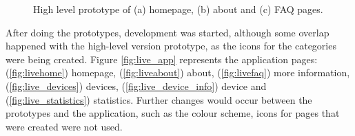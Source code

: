 \begin{figure}[H]
\begin{subfigure}{0.33\textwidth}
        \caption{}
        \label{fig:highfaq}
    \end{subfigure}%
    \caption{High level prototype of (a) homepage, (b) about and (c) FAQ pages.}
    \label{fig:highlevelprototype}
\end{figure}

After doing the prototypes, development was started, although some overlap
happened with the high-level version prototype, as the icons for the categories
were being created. Figure \ref{fig:live_app} represents the application pages:
(\ref{fig:livehome}) homepage, (\ref{fig:liveabout}) about, (\ref{fig:livefaq}) more
information, (\ref{fig:live_devices}) \hyperlink{\acronym}{\acronym} devices, (\ref{fig:live_device_info}) device
and (\ref{fig:live_statistics}) statistics.
Further changes would occur between the prototypes and
the application, such as the colour scheme, icons for pages that were created
were not used.

